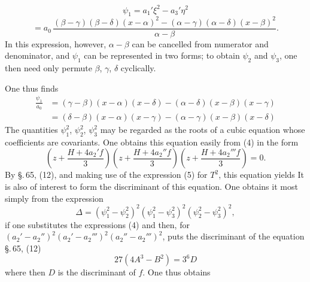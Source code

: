 \[
\psi_1 = a_1'\xi^2 - a_3'\eta^2
\]
\[
= a_0\,\frac{(\beta-\gamma)(\beta-\delta)(x-\alpha)^2 - (\alpha-\gamma)(\alpha-\delta)(x-\beta)^2}{\alpha-\beta}.
\]
In this expression, however, $\alpha - \beta$ can be cancelled from numerator and denominator, and
$\psi_1$ can be represented in two forms; to obtain $\psi_2$ and $\psi_3$, one then
need only permute $\beta$, $\gamma$, $\delta$ cyclically.

One thus finds
\[
\begin{aligned}
\frac{\psi_1}{a_0} &= (\gamma-\beta)(x-\alpha)(x-\delta) - (\alpha-\delta)(x-\beta)(x-\gamma) \\
&= (\delta-\beta)(x-\alpha)(x-\gamma) - (\alpha-\gamma)(x-\beta)(x-\delta)
\end{aligned}
\]
The quantities $\psi_1^2$, $\psi_2^2$, $\psi_3^2$ may be regarded as the roots
of a cubic equation whose coefficients are covariants. One obtains
this equation easily from (4) in the form
\[
\left(z + \frac{H+4a_2'f}{3}\right)\left(z + \frac{H+4a_2''f}{3}\right)\left(z + \frac{H+4a_2'''f}{3}\right) = 0.
\]
By \S.\,65, (12), and making use of the expression (5) for $T^2$, this equation yields
It is also of interest to form the discriminant of this equation. One
obtains it most simply from the expression
\[
\varDelta = (\psi_1^2 - \psi_2^2)^2(\psi_1^2 - \psi_3^2)^2(\psi_2^2 - \psi_3^2)^2,
\]
if one substitutes the expressions (4) and then, for $(a_2'-a_2'')^2(a_2'-a_2''')^2(a_2''-a_2''')^2$,
puts the discriminant of the equation \S.\,65, (12)
\[
27(4A^3 - B^2) = 3^6 D
\]
where then $D$ is the discriminant of $f$. One thus obtains
